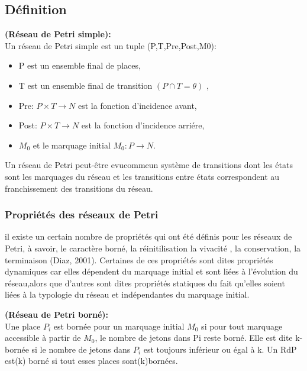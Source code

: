 \subsection{Définition}

\begin{defn}\textbf{\textbf{(Réseau de Petri simple):}}
	\\
Un réseau de Petri simple est un tuple
 (P,T,Pre,Post,M0):
 
 \begin{itemize}
\item  	P est un ensemble final de places,
\item T est un ensemble final de transition $ (P \cap T = \theta ) $ ,
\item Pre: $P \times T \to N$ est la fonction d'incidence avant,
\item Post: $P \times T \to N$ est la fonction d'incidence arriére,
\item $M_{0}$ et le marquage initial $M_{0}:  P \to N$.
  \end{itemize}

\end{defn}




Un réseau de Petri peut-être evucommeun système de transitions dont les états sont les marquages du réseau et les transitions entre états correspondent au franchissement des transitions du réseau.
\subsubsection{Propriétés des réseaux de Petri}
il existe un certain nombre de propriétés qui ont été définis pour les réseaux de Petri, à savoir, le caractère borné, la réinitilisation la vivacité , la conservation, la terminaison (Diaz, 2001). Certaines de ces propriétés sont dites propriétés dynamiques car elles dépendent du marquage initial et sont liées à l'évolution du réseau,alors que d'autres sont dites propriétés statiques du fait qu'elles soient liées à la typologie du réseau et indépendantes du marquage initial.


\begin{defn}\textbf{\textbf{(Réseau de Petri borné):}}\\
Une place $ P_{i} $ est bornée pour un marquage initial $ M_{0} $ si pour tout marquage accessible à partir de $ M_{0} $, le nombre de jetons dans Pi reste borné. Elle est dite k-bornée si le nombre de jetons dans $ P_{i} $ est toujours inférieur ou égal à k. Un RdP est(k) borné si tout esses places sont(k)bornées.

\end{defn}

